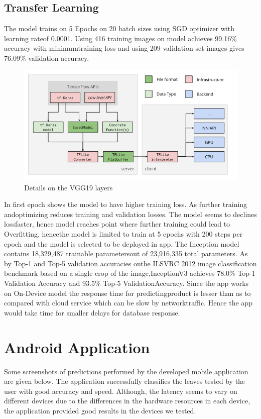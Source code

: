 \subsection{Transfer Learning}
The model trains on 5 Epochs on 20 batch sizes using SGD optimizer with learning rateof 0.0001. Using 416 training images on model achieves 99.16\% accuracy with minimumtraining loss and using 209 validation set images gives 76.09\% validation accuracy.\\
\begin{figure}[H]
	\label{ss}
	\centering
	\includegraphics[width=15cm,keepaspectratio]{tflite-converter-workflow.png}
	\caption{Details on the VGG19 layers}
\end{figure}
In first epoch shows the model to have higher training loss.  As further training andoptimizing  reduces  training  and  validation  losses.   The  model  seems  to  declines  lossfaster, hence model reaches point where further training could lead to Overfitting, hencethe model is limited to train at 5 epochs with 200 steps per epoch and the model is selected to be deployed in app.  The Inception model contains 18,329,487 trainable parametersout  of  23,916,335  total  parameters.   As  by  Top-1  and  Top-5  validation  accuracies  onthe ILSVRC 2012 image classification benchmark based on a single crop of the image,InceptionV3  achieves  78.0\%  Top-1  Validation  Accuracy  and  93.5\%  Top-5  ValidationAccuracy.  Since the app works on On-Device model the response time for predictingproduct is lesser than as to compared with cloud service which can be slow by networktraffic. Hence the app would take time for smaller delays for database response.

\section{Android Application}
Some screenshots of predictions performed by the developed mobile application are given below. The application successfully classifies the leaves tested by the user with good accuracy and speed. Although, the latency seems to vary on different devices due to the differences in the hardware resources in each device, the application provided good results in the devices we tested.

